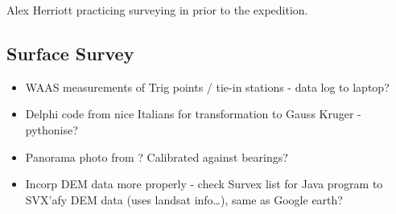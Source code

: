 \begin{marginfigure}
\checkoddpage \ifoddpage \forcerectofloat \else \forceversofloat \fi
\centering
 \caption{Alex Herriott practicing surveying in  prior to the expedition. }
 \label{survey practice yordas}
\end{marginfigure}  

    \subsection{Surface Survey}
        \begin{itemize}
            \item WAAS measurements of Trig points / tie-in stations - data log to laptop?
            \item Delphi code from nice Italians for transformation to Gauss Kruger - pythonise?
            \item Panorama photo from ? Calibrated against bearings?
            \item Incorp DEM data more properly - check Survex list for Java program to SVX'afy DEM data (uses landsat info\ldots{}), same as Google earth?
        \end{itemize}
        
